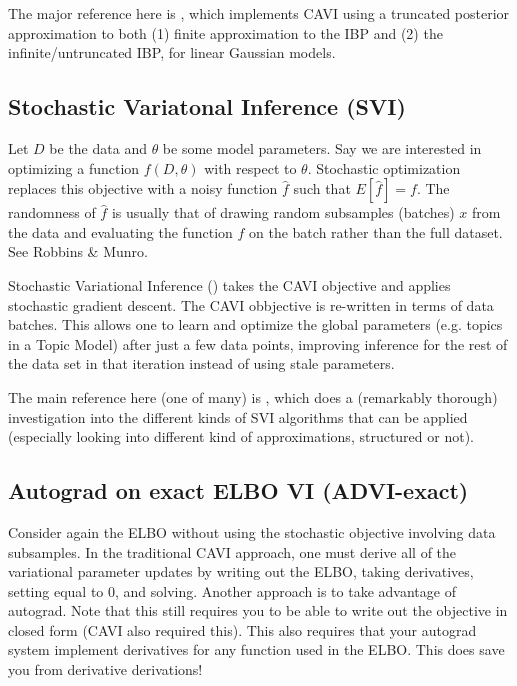 \documentclass[a4paper, 11pt]{article}
\begin{document}
\medskip

The major reference here is \citet{doshi2009variational}, which implements CAVI using a truncated posterior approximation to both (1) finite approximation to the IBP and (2) the infinite/untruncated IBP, for linear Gaussian models.

\subsection{Stochastic Variatonal Inference (SVI)}

Let $D$ be the data and $\theta$ be some model parameters. Say we
are interested in optimizing a function $f(D,\theta)$ with respect
to $\theta$. Stochastic optimization replaces this objective with
a noisy function $\hat{f}$ such that $E[\hat{f}] = f$. The randomness
of $\hat{f}$ is usually that of drawing random subsamples (batches) $x$ from the data and evaluating the function $f$ on the batch rather than the full
dataset. See Robbins \& Munro.

\medskip

Stochastic Variational Inference (\citet{hoffman2013stochastic}) takes the CAVI objective and applies stochastic gradient descent. The CAVI obbjective is re-written in terms of data batches. This allows one to learn and optimize the global parameters (e.g. topics in a Topic Model) after just a few data points, improving inference for the rest of the data set in that iteration instead of using stale parameters.

\medskip

The main reference here (one of many) is \citet{shah2015empirical}, which does a (remarkably thorough) investigation into the different kinds of SVI algorithms that can be applied (especially looking into different kind of approximations, structured or not).

\subsection{Autograd on exact ELBO VI (ADVI-exact)}

Consider again the ELBO without using the stochastic objective involving data subsamples. In the traditional CAVI approach, one must derive all of the variational parameter updates by writing out the ELBO, taking derivatives, setting equal to 0, and solving. Another approach is to take advantage of autograd. Note that this still requires you to be able to write out the objective in closed form (CAVI also required this). This also
requires that your autograd system implement derivatives for any function
used in the ELBO. This does save you from derivative derivations!
\end{document}
